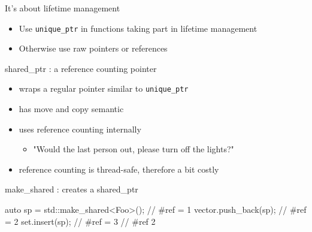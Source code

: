 \begin{frame}[fragile]
  \begin{block}{It's about lifetime management}
    \begin{itemize}
    \item Use \texttt{unique_ptr} in functions taking part in lifetime management
    \item Otherwise use raw pointers or references
    \end{itemize}
  \end{block}
\end{frame}

\begin{frame}[fragile]
  \begin{block}{shared\_ptr : a reference counting pointer}
    \begin{itemize}
    \item wraps a regular pointer similar to \texttt{unique_ptr}
    \item has move and copy semantic
    \item uses reference counting internally
      \begin{itemize}
      \item "Would the last person out, please turn off the lights?"
      \end{itemize}
    \item reference counting is thread-safe, therefore a bit costly
    \end{itemize}
  \end{block}
  \begin{block}{make\_shared : creates a shared\_ptr}
    \begin{cppcode*}{}
      {
        auto sp = std::make_shared<Foo>(); // #ref = 1
        vector.push_back(sp);              // #ref = 2
        set.insert(sp);                    // #ref = 3
      } // #ref 2
    \end{cppcode*}
  \end{block}
\end{frame}

